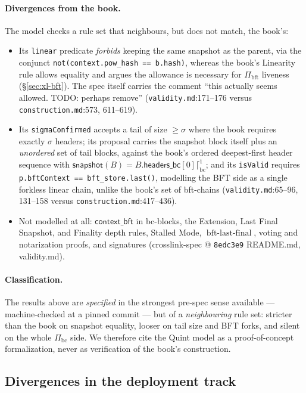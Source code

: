 \documentclass[11pt,a4paper]{article}
\theoremstyle{definition}
\begin{document}
\paragraph{Divergences from the book.} The model checks a rule set that
neighbours, but does not match, the book's:
\begin{itemize}
\item Its \texttt{linear} predicate \emph{forbids} keeping the same
  snapshot as the parent, via the conjunct
  \texttt{not(context.pow\_hash == b.hash)},
  whereas the book's Linearity rule allows equality and argues the
  allowance is necessary for $\Pi_{\mathrm{bft}}$ liveness
  (\S\ref{sec:xl-bft}). The spec itself carries the comment ``this
  actually seems allowed. TODO: perhaps remove''
  (\texttt{validity.md}:171--176 versus
  \texttt{construction.md}:573, 611--619).
\item Its \texttt{sigmaConfirmed} accepts a tail of size $\ge \sigma$
  where the book requires exactly $\sigma$ headers; its proposal carries
  the snapshot block itself plus an \emph{unordered} set of tail blocks,
  against the book's ordered deepest-first header sequence with
  $\mathsf{snapshot}(B) = B.\mathsf{headers\_bc}[0]
  \lceil^{1}_{\mathrm{bc}}$; and its \texttt{isValid} requires
  \texttt{p.bftContext == bft\_store.last()}, modelling the BFT side as a
  single forkless linear chain, unlike the book's set of bft-chains
  (\texttt{validity.md}:65--96, 131--158 versus
  \texttt{construction.md}:417--436).
\item Not modelled at all: $\mathsf{context\_bft}$ in bc-blocks, the
  Extension, Last Final Snapshot, and Finality depth rules, Stalled Mode,
  $\operatorname{bft\text{-}last\text{-}final}$, voting and notarization
  proofs, and signatures (crosslink-spec @ \texttt{8edc3e9} README.md,
  validity.md).
\end{itemize}

\paragraph{Classification.} The results above are \emph{specified} in
the strongest pre-spec sense available --- machine-checked at a pinned
commit --- but of a \emph{neighbouring} rule set: stricter than the book
on snapshot equality, looser on tail size and BFT forks, and silent on
the whole $\Pi_{\mathrm{bc}}$ side. We therefore cite the Quint model as
a proof-of-concept formalization, never as verification of the book's
construction.

\subsection{Divergences in the deployment track}\label{sec:xl-divergences}
\end{document}
